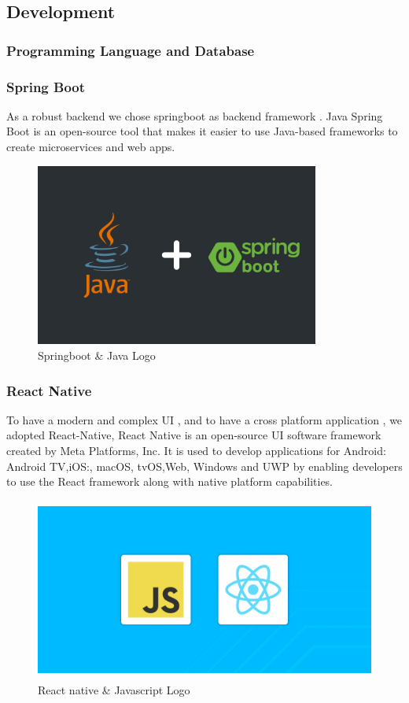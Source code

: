 \subsection{Development}
\subsubsection{Programming Language and Database}
\subsubsection*{Spring Boot}
As a robust backend we chose springboot as backend framework .
Java Spring Boot is an open-source tool that makes it easier to use Java-based frameworks to create microservices and web apps.\cite{Springboot} 
\begin{figure}[H]
    \centering
    \includegraphics[height=6cm]{images/chap1/springJava.png}
    \caption{Springboot \& Java Logo}
    \label{fig:enter-label}
\end{figure}
\subsubsection*{React Native}
To have a modern and complex UI , and to have a cross platform application , we adopted React-Native, 
React Native is an open-source UI software framework created by Meta Platforms, Inc. It is used to develop applications for Android: Android TV,iOS:, macOS, tvOS,Web, Windows and UWP by enabling developers to use the React framework along with native platform capabilities.\cite{ReactNative}
\begin{figure}[H]
    \centering
    \includegraphics[height=6cm]{images/chap1/reactnativeJS.png}
    \caption{React native \& Javascript Logo}
    \label{fig:enter-label}
\end{figure}
